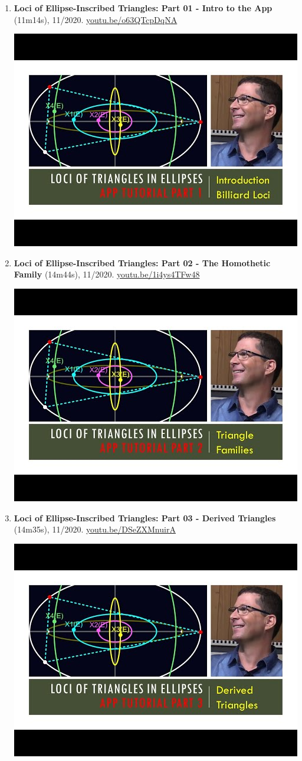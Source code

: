 \documentclass[12pt]{article}
\begin{document}
\begin{enumerate}[resume]
\item \textbf{Loci of Ellipse-Inscribed Triangles: Part 01 - Intro to the App} (11m14s), 11/2020. \href{https://youtu.be/o63QTcpDqNA}{\url{youtu.be/o63QTcpDqNA}}
\begin{center}\includegraphics[width=.5\textwidth]{pics/o63QTcpDqNA.jpg}\end{center}
% 
\item \textbf{Loci of Ellipse-Inscribed Triangles: Part 02 - The Homothetic Family} (14m44s), 11/2020. \href{https://youtu.be/1i4ys4TFw48}{\url{youtu.be/1i4ys4TFw48}}
\begin{center}\includegraphics[width=.5\textwidth]{pics/1i4ys4TFw48.jpg}\end{center}
% 
\item \textbf{Loci of Ellipse-Inscribed Triangles: Part 03 - Derived Triangles} (14m35s), 11/2020. \href{https://youtu.be/DSeZXMnuirA}{\url{youtu.be/DSeZXMnuirA}}
\begin{center}\includegraphics[width=.5\textwidth]{pics/DSeZXMnuirA.jpg}\end{center}

\end{enumerate}
\end{document}
